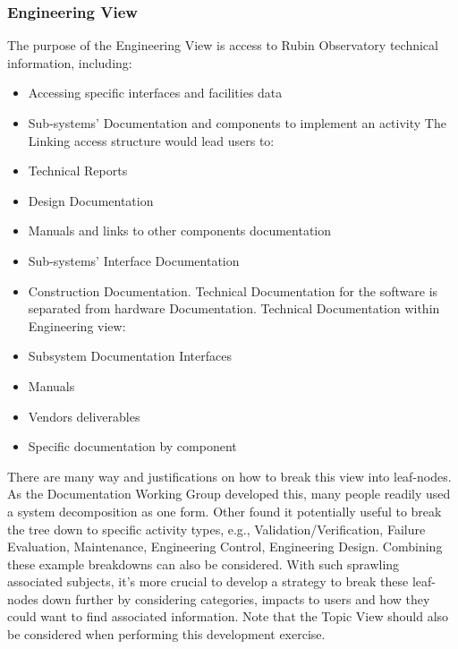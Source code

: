\subsubsection{Engineering View}

The purpose of the Engineering View is access to Rubin Observatory technical information, including:

\begin{itemize}
\item Accessing specific interfaces and facilities data
\item Sub-systems' Documentation and components to implement an activity 
The Linking access structure would lead users to:
\item Technical Reports
\item Design Documentation
\item Manuals and links to other components documentation
\item Sub-systems' Interface Documentation
\item Construction Documentation. Technical Documentation for the software is separated from hardware Documentation. Technical Documentation within Engineering view:
\item Subsystem Documentation Interfaces
\item Manuals
\item Vendors deliverables
\item Specific documentation by component
\end{itemize}

There are many way and justifications on how to break this view into leaf-nodes.
As the Documentation Working Group developed this, many people readily used a system decomposition as one form.
Other found it potentially useful to break the tree down to specific activity types, e.g., Validation/Verification, Failure Evaluation, Maintenance, Engineering Control, Engineering Design.
Combining these example breakdowns can also be considered.
With such sprawling associated subjects, it's more crucial to develop a strategy to break these leaf-nodes down further by considering categories, impacts to users and how they could want to find associated information.
Note that the Topic View should also be considered when performing this development exercise.
